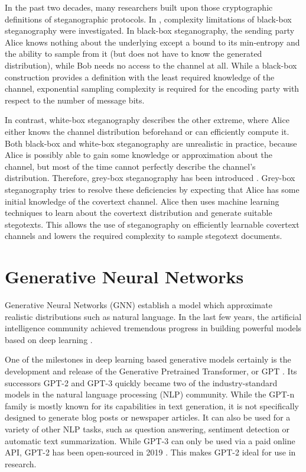 In the past two decades, many researchers built upon those cryptographic definitions of steganographic protocols.
In \cite{DIRR2008}, complexity limitations of black-box steganography were investigated.
In black-box steganography, the sending party Alice knows nothing about the underlying except a bound to its min-entropy and the ability to sample from it (but does not have to know the generated distribution), while Bob needs no access to the channel at all.
While a black-box construction provides a definition with the least required knowledge of the channel, exponential sampling complexity is required for the encoding party with respect to the number of message bits.

In contrast, white-box steganography describes the other extreme, where Alice either knows the channel distribution beforehand or can efficiently compute it.
Both black-box and white-box steganography are unrealistic in practice, because Alice is possibly able to gain some knowledge or approximation about the channel, but most of the time cannot perfectly describe the channel's distribution.
Therefore, grey-box steganography has been introduced \cite{LRW2013}.
Grey-box steganography tries to resolve these deficiencies by expecting that Alice has some initial knowledge of the covertext channel.
Alice then uses machine learning techniques to learn about the covertext distribution and generate suitable stegotexts.
This allows the use of steganography on efficiently learnable covertext channels and lowers the required complexity to sample stegotext documents.

\section{Generative Neural Networks}
\label{sec:generative-neural-networks}

Generative Neural Networks (GNN) establish a model which approximate realistic distributions such as natural language.
In the last few years, the artificial intelligence community achieved tremendous progress in building powerful models based on deep learning \cite{DeepLearning2015}.

One of the milestones in deep learning based generative models certainly is the development and release of the Generative Pretrained Transformer, or GPT \cite{OpenAI2018}.
Its successors GPT-2 \cite{OpenAI2019} and GPT-3 \cite{OpenAI2020} quickly became two of the industry-standard models in the natural language processing (NLP) community.
While the GPT-n family is mostly known for its capabilities in text generation, it is not specifically designed to generate blog posts or newspaper articles.
It can also be used for a variety of other NLP tasks, such as question answering, sentiment detection or automatic text summarization.
While GPT-3 can only be used via a paid online API, GPT-2 has been open-sourced in 2019 \cite{GPTReleasePlan2019}.
This makes GPT-2 ideal for use in research.

